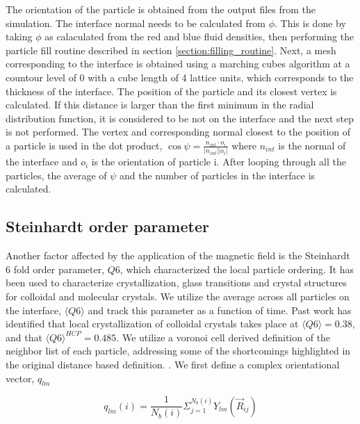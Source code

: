 The orientation of the particle is obtained from the output files from the simulation. The interface normal needs to 
be calculated from $\phi$. This is done by taking $\phi$ as calaculated from the red and blue fluid densities, then 
performing the particle fill routine described in section \ref{section:filling_routine}. Next, a mesh corresponding 
to the interface is obtained using a marching cubes algorithm at a countour level of 0 with a cube length of 4 lattice 
units, which corresponds to the thickness of the interface. \cite{van_der_walt_scikit-image:_2014} The 
position of the particle and its closest vertex is calculated. If this distance is larger than the first minimum in 
the radial distribution function, it is considered to be not on the interface and the next step is not performed. The 
vertex and corresponding normal closest to the position of a particle is used in the dot product, 
$\cos{\psi} = \frac{n_{int} \cdot o_{i}}{|n_{int}| |o_i|}$ where $n_{int}$ is the normal of the interface and $o_i$ 
is the orientation of particle i. After looping through all the particles, the average of $\psi$ and the number of 
particles in the interface is calculated.

\subsection{Steinhardt order parameter}
\label{section:steinhardt_order_parameter}

Another factor affected by the application of the magnetic field is the Steinhardt 6 fold order parameter, $Q6$, which characterized the local 
particle ordering. \cite{steinhardt_bond-orientational_1983} It has been used to characterize crystallization, glass transitions and crystal 
structures for colloidal and molecular crystals. We utilize the average across all particles on the interface, $\langle Q6 \rangle$ and track 
this parameter as a function of time. Past work has identified that local crystallization of colloidal crystals takes place at $\langle Q6 \rangle = 0.38$, 
and that $\langle Q6 \rangle^{HCP} = 0.485$. \cite{steinhardt_bond-orientational_1983, toxvaerd_role_2020, mickel_shortcomings_2013} We utilize a voronoi 
cell derived definition of the neighbor list of each particle, addressing some of the shortcomings highlighted in the original distance based definition. 
\cite{steinhardt_bond-orientational_1983, mickel_shortcomings_2013}. We first define a complex orientational vector, $q_{lm}$

\begin{equation}
q_{lm}(i) = \frac{1}{N_b(i)} \Sigma_{j = 1}^{N_b(i)} Y_{lm}(\vec{R}_{ij})
\end{equation}


